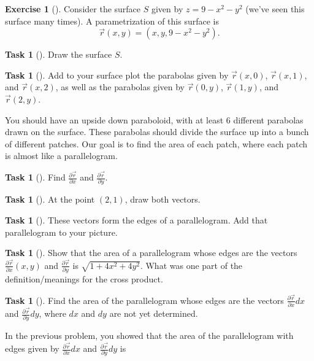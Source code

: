 \documentclass[10pt,]{book}
\theoremstyle{plain}
\theoremstyle{definition}
\theoremstyle{definition}
\theoremstyle{definition}
\theoremstyle{definition}
\newtheorem{exploration}[project]{Exercise}
\newtheorem{task}[project]{Task}
\theoremstyle{definition}
\numberwithin{equation}{section}
\newcommand{\ds}{\displaystyle}
\begin{document}
\begin{exploration}[]\label{exploration-276}
Consider the surface \(S\) given by \(z=9-x^2-y^2\) (we've seen this surface many times). A parametrization of this surface is%
\begin{equation*}
\vec r(x,y) = (x,y,9-x^2-y^2).
\end{equation*}
%
\begin{task}[]\label{task-742}
Draw the surface \(S\).%
\end{task}
\begin{task}[]\label{task-743}
Add to your surface plot the parabolas given by \(\vec r(x,0)\), \(\vec r(x,1)\), and \(\vec r(x,2)\), as well as the parabolas given by \(\vec r(0,y)\), \(\vec r(1,y)\), and \(\vec r(2,y)\).%
\end{task}
You should have an upside down paraboloid, with at least 6 different parabolas drawn on the surface. These parabolas should divide the surface up into a bunch of different patches. Our goal is to find the area of each patch, where each patch is almost like a parallelogram.%
\begin{task}[]\label{task-744}
Find \(\ds \frac{\partial \vec r}{\partial x}\) and \(\ds\frac{\partial \vec r}{\partial y}\).%
\end{task}
\begin{task}[]\label{task-745}
At the point \((2,1)\), draw both vectors.%
\end{task}
\begin{task}[]\label{task-746}
These vectors form the edges of a parallelogram. Add that parallelogram to your picture.%
\end{task}
\begin{task}[]\label{task-747}
Show that the area of a parallelogram whose edges are the vectors \(\ds\frac{\partial \vec r}{\partial x}(x,y)\) and \(\ds\frac{\partial \vec r}{\partial y}\) is \(\sqrt{1+4x^2+4y^2}\). What was one part of the definition/meanings for the cross product.%
%
\end{task}
\begin{task}[]\label{task-748}
Find the area of the parallelogram whose edges are the vectors \(\ds\frac{\partial \vec r}{\partial x}dx\) and \(\ds\frac{\partial \vec r}{\partial y}dy\), where \(dx\) and \(dy\) are not yet determined.%
\end{task}
\end{exploration}
In the previous problem, you showed that the area of the parallelogram with edges given by \(\frac{\partial \vec r}{\partial x}dx\) and \(\frac{\partial \vec r}{\partial y}dy\) is%
\end{document}
